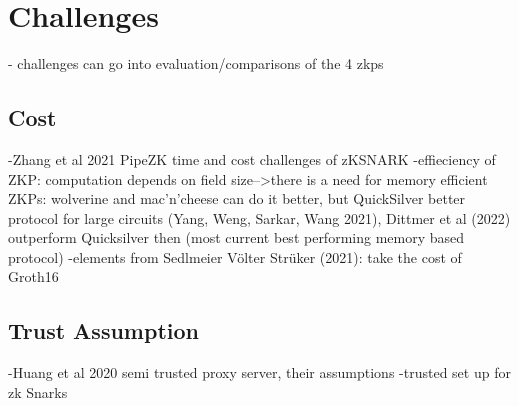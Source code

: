 \section{Challenges}

- challenges can go into evaluation/comparisons of the 4 zkps
\subsection{Cost}
-Zhang et al 2021 PipeZK time and cost challenges of zKSNARK
-effieciency of ZKP: computation depends on field size-->there is a need for memory efficient ZKPs: wolverine and mac'n'cheese can do it better, but QuickSilver better protocol for large circuits (Yang, Weng, Sarkar, Wang 2021), Dittmer et al (2022) outperform Quicksilver then (most current best performing memory based protocol)
-elements from Sedlmeier Völter Strüker (2021): take the cost of Groth16

\subsection{Trust Assumption}
-Huang et al 2020 semi trusted proxy server, their assumptions
-trusted set up for zk Snarks

